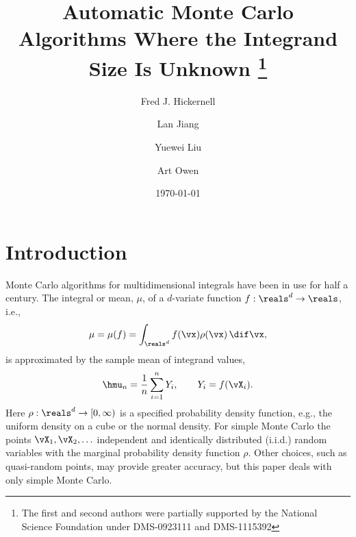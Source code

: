 \documentclass[graybox]{svmult}
\begin{document}
\date{\today}
\title*{Automatic Monte Carlo Algorithms Where the Integrand Size Is Unknown
\thanks{The first and second authors were partially supported by the National
Science Foundation under DMS-0923111 and DMS-1115392}}
\author{Fred J. Hickernell \and
Lan Jiang \and Yuewei Liu \and Art Owen }
%
%
\maketitle



\section{Introduction}

Monte Carlo algorithms for multidimensional integrals have been in use for half a century.  The integral or mean, $\mu$, of a $d$-variate function $f: \reals^d \to \reals$, i.e.,
\begin{equation*} 
\mu= \mu(f) = \int_{\reals^d} f(\vx) \rho(\vx) \, \dif \vx,
\end{equation*}
is approximated by the sample mean of integrand values,
\begin{equation} \label{samplemean}
\hmu_n = \frac 1n \sum_{i=1}^n Y_i, \qquad Y_i = f(\vX_i).
\end{equation}
Here $\rho: \reals^d \to [0,\infty)$ is a specified probability density function, e.g., the uniform density on a cube or the normal density.  For simple Monte Carlo the points $\vX_1, \vX_2, \ldots$ independent and identically distributed (i.i.d.) random variables with the marginal probability density function $\rho$.  Other choices, such as quasi-random points, may provide greater accuracy, but this paper deals with only simple Monte Carlo.
\end{document}
